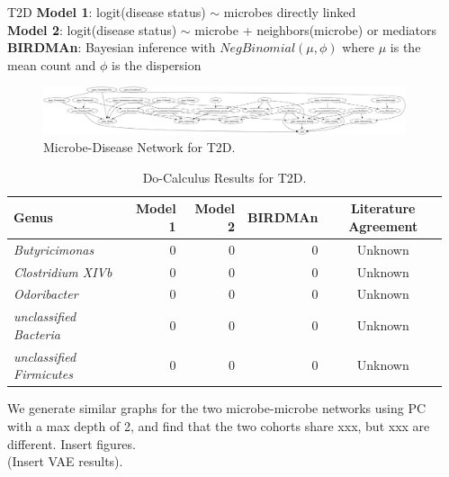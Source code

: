 \documentclass[final]{beamer}
\newlength{\sepwidth}
\newlength{\colwidth}
\newcommand{\separatorcolumn}{\begin{column}{\sepwidth}\end{column}}
\begin{document}
\begin{frame}[t]
\begin{columns}[t]
\begin{column}{\colwidth}
\begin{block}{T2D}
    \textbf{Model 1}: logit(disease status) $\sim$ microbes directly linked \\
    \textbf{Model 2}: logit(disease status) $\sim$ microbe + neighbors(microbe) or mediators \\
    \textbf{BIRDMAn}: Bayesian inference with $NegBinomial(\mu, \phi)$ where $\mu$ is the mean count and $\phi$ is the dispersion

    \begin{figure}
      \centering
      \includegraphics[width=\linewidth]{../graphs/t2d/cdnod_norm.png}
      \caption{Microbe-Disease Network for T2D.}
    \end{figure}
    
    \begin{table}
      \centering
      \begin{tabular}{l r r r c}
        \toprule
        \textbf{Genus} & \textbf{Model 1} & \textbf{Model 2} & \textbf{BIRDMAn} & \textbf{Literature Agreement} \\
        \midrule
        \textit{Butyricimonas} & 0 & 0 & 0 & Unknown \\
        \textit{Clostridium XIVb} & 0 & 0 & 0 & Unknown \\
        \textit{Odoribacter} & 0 & 0 & 0 & Unknown \\
        \textit{unclassified Bacteria} & 0 & 0 & 0 & Unknown \\
        \textit{unclassified Firmicutes} & 0 & 0 & 0 & Unknown \\
        \bottomrule
      \end{tabular}
      \caption{Do-Calculus Results for T2D.}
    \end{table}
    
    We generate similar graphs for the two microbe-microbe networks using PC with a max depth of 2, and find that the two cohorts share xxx, but xxx are different. Insert figures. \\
    
    (Insert VAE results).

  \end{block}

  
\end{column}

\separatorcolumn


\end{columns}
\end{frame}
\end{document}
